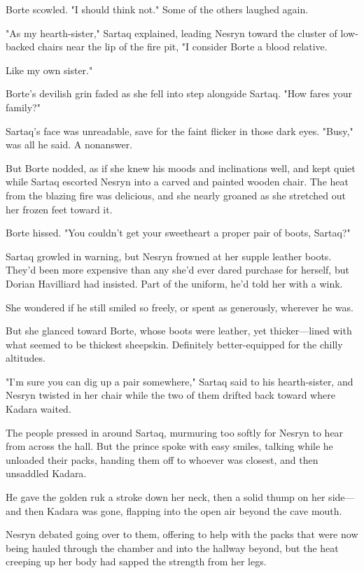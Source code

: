 Borte scowled. "I should think not." Some of the others laughed again.

"As my hearth-sister," Sartaq explained, leading Nesryn toward the cluster of low-backed chairs near the lip of the fire pit, "I consider Borte a blood relative.

Like my own sister."

Borte's devilish grin faded as she fell into step alongside Sartaq. "How fares your family?"

Sartaq's face was unreadable, save for the faint flicker in those dark eyes. "Busy," was all he said. A nonanswer.

But Borte nodded, as if she knew his moods and inclinations well, and kept quiet while Sartaq escorted Nesryn into a carved and painted wooden chair. The heat from the blazing fire was delicious, and she nearly groaned as she stretched out her frozen feet toward it.

Borte hissed. "You couldn't get your sweetheart a proper pair of boots, Sartaq?"

Sartaq growled in warning, but Nesryn frowned at her supple leather boots. They'd been more expensive than any she'd ever dared purchase for herself, but Dorian Havilliard had insisted. Part of the uniform, he'd told her with a wink.

She wondered if he still smiled so freely, or spent as generously, wherever he was.

But she glanced toward Borte, whose boots were leather, yet thicker---lined with what seemed to be thickest sheepskin. Definitely better-equipped for the chilly altitudes.

"I'm sure you can dig up a pair somewhere," Sartaq said to his hearth-sister, and Nesryn twisted in her chair while the two of them drifted back toward where Kadara waited.

The people pressed in around Sartaq, murmuring too softly for Nesryn to hear from across the hall. But the prince spoke with easy smiles, talking while he unloaded their packs, handing them off to whoever was closest, and then unsaddled Kadara.

He gave the golden ruk a stroke down her neck, then a solid thump on her side---and then Kadara was gone, flapping into the open air beyond the cave mouth.

Nesryn debated going over to them, offering to help with the packs that were now being hauled through the chamber and into the hallway beyond, but the heat creeping up her body had sapped the strength from her legs.

